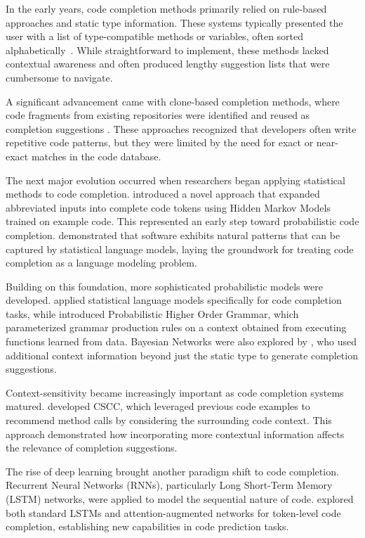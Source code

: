 In the early years, code completion methods primarily relied on rule-based approaches and static type information. These systems typically presented the user with a list of type-compatible methods or variables, often sorted alphabetically~\parencite{mandelin2005}. While straightforward to implement, these methods lacked contextual awareness and often produced lengthy suggestion lists that were cumbersome to navigate.

A significant advancement came with clone-based completion methods, where code fragments from existing repositories were identified and reused as completion suggestions \parencite{hill2004}. These approaches recognized that developers often write repetitive code patterns, but they were limited by the need for exact or near-exact matches in the code database.

The next major evolution occurred when researchers began applying statistical methods to code completion. \citet{han2009} introduced a novel approach that expanded abbreviated inputs into complete code tokens using Hidden Markov Models trained on example code. This represented an early step toward probabilistic code completion. \citet{hindle2012} demonstrated that software exhibits natural patterns that can be captured by statistical language models, laying the groundwork for treating code completion as a language modeling problem.

Building on this foundation, more sophisticated probabilistic models were developed. \citet{raychev2014} applied statistical language models specifically for code completion tasks, while \citet{bielik2016} introduced Probabilistic Higher Order Grammar, which parameterized grammar production rules on a context obtained from executing functions learned from data. Bayesian Networks were also explored by \citet{proksch2015}, who used additional context information beyond just the static type to generate completion suggestions.

Context-sensitivity became increasingly important as code completion systems matured. \citet{asaduzzaman2014} developed CSCC, which leveraged previous code examples to recommend method calls by considering the surrounding code context. This approach demonstrated how incorporating more contextual information affects the relevance of completion suggestions.

The rise of deep learning brought another paradigm shift to code completion. Recurrent Neural Networks (RNNs), particularly Long Short-Term Memory (LSTM) networks, were applied to model the sequential nature of code. \citet{ginzberg2017} explored both standard LSTMs and attention-augmented networks for token-level code completion, establishing new capabilities in code prediction tasks.

